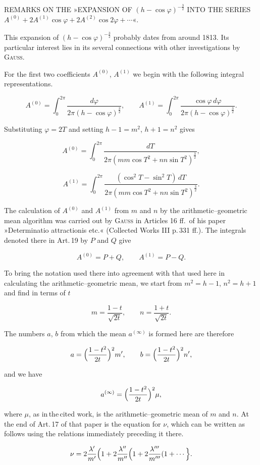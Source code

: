 %

\begin{center}
REMARKS ON THE »EXPANSION OF $(h-\cos\varphi)^{-\frac{3}{2}}$
INTO THE SERIES $A^{(0)}+2A^{(1)}\cos\varphi+2A^{(2)}\cos2\varphi+\cdots$«.
\end{center}

This expansion of $(h-\cos\varphi)^{-\frac{3}{2}}$ probably dates from around
1813. Its particular interest lies in its several connections with other
investigations by \textsc{Gauss}.

For the first two coefficients $A^{(0)}$, $A^{(1)}$ we begin with
the following integral representations.

\[
A^{(0)}=\int_{0}^{2\pi}\frac{d\varphi}{2\pi(h-\cos\varphi)^{\frac{3}{2}}},\qquad
A^{(1)}=\int_{0}^{2\pi}\frac{\cos\varphi\,d\varphi}{2\pi(h-\cos\varphi)^{\frac{3}{2}}}.
\]

\noindent Substituting $\varphi=2T$ and setting $h-1=m^{2}$, $h+1=n^{2}$ gives

\[
A^{(0)}=\int_{0}^{2\pi}\frac{dT}{2\pi(mm\cos T^{2}+nn\sin T^{2})^{\frac{3}{2}}},
\]

\[
A^{(1)}=\int_{0}^{2\pi}\frac{(\cos^{2}T-\sin^{2}T)\,dT}{2\pi(mm\cos T^{2}+nn\sin T^{2})^{\frac{3}{2}}}.
\]

\noindent The calculation of $A^{(0)}$ and $A^{(1)}$ from $m$ and $n$ by the
arithmetic–geometric mean algorithm was carried out by \textsc{Gauss} in Articles 16 ff.\
of his paper »Determinatio attractionis etc.« (Collected Works III p.\,331 ff.).
The integrals denoted there in Art.\,19 by $P$ and $Q$ give

\[
A^{(0)}=P+Q,\qquad A^{(1)}=P-Q.
\]

\noindent To bring the notation used there into agreement with that used here in calculating the
arithmetic–geometric mean, we start
from $m^{2}=h-1$, $n^{2}=h+1$ and find in terms of $t$

\[
m=\frac{1-t}{\sqrt{2t}},\qquad n=\frac{1+t}{\sqrt{2t}}.
\]

\noindent The numbers $a$, $b$ from which the mean $a^{(\infty)}$ is formed here are
therefore

\[
a=\Bigl(\frac{1-t^{2}}{2t}\Bigr)^{2}m',\qquad b=\Bigl(\frac{1-t^{2}}{2t}\Bigr)^{2}n',
\]

\noindent and we have

\[
a^{(\infty)}=\Bigl(\frac{1-t^{2}}{2t}\Bigr)^{2}\mu,
\]

\noindent where $\mu$, as in\,the\,cited work, is the arithmetic–geometric mean of $m$ and $n$.
At the end of Art.\,17 of that paper is the equation for $\nu$,
which can be written as follows using the relations immediately preceding it there.

\[
\nu=2\frac{\lambda'}{m'}\Bigl(1+2\frac{\lambda''}{m''}\Bigl(1+2\frac{\lambda'''}{m'''}(1+\cdots\Bigr\}.
\]

